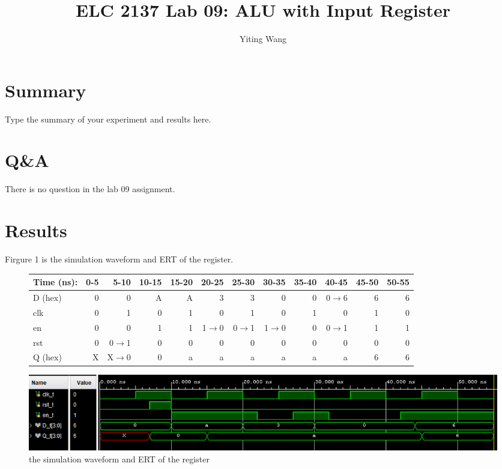 \documentclass[11pt]{article}
\begin{document}
\title{ELC 2137 Lab 09: ALU with Input Register}
\author{Yiting Wang}

\maketitle


\section*{Summary}

Type the summary of your experiment and results here.  


\section*{Q\&A}

There is no question in the lab 09 assignment.


\section*{Results}


Firgure 1 is the simulation waveform and ERT of the register.\\
\begin{figure}[ht]\centering
	\begin{tabular}{l|rrrrrrrrrrr}
		Time (ns): & 0-5 & 5-10 & 10-15 & 15-20 & 20-25 & 25-30 & 30-35 & 35-40 & 40-45 & 45-50 & 50-55 \\
		\midrule
		D (hex) & 0 & 0 	  & A & A & 3 	    & 3 	  & 0 	    & 0 & 0$\to$6 & 6 & 6 \\
		clk     & 0 & 1 	  & 0 & 1 & 0 	    & 1 	  & 0 	    & 1 & 0 	  & 1 & 0 \\
		en  	& 0 & 0 	  & 1 & 1 & 1$\to$0 & 0$\to$1 & 1$\to$0 & 0 & 0$\to$1 & 1 & 1 \\
		rst 	& 0 & 0$\to$1 & 0 & 0 & 0 		& 0 	  & 0		& 0 & 0		  & 0 & 0 \\
		\midrule
		Q (hex) & X & X$\to$0 & 0 & a & a & a & a & a & a & 6 & 6 \\
		\bottomrule
	\end{tabular}\medskip
	
	\includegraphics[width=1\textwidth]{register_simulation}
	\caption{the simulation waveform and ERT of the register}
	\label{fig:register_simulation}
\end{figure}
\end{document}
